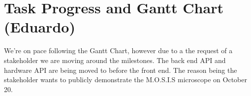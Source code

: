 \section{Task Progress and Gantt Chart (Eduardo)}
We're on pace following the Gantt Chart, however due to a the request of a stakeholder we are moving around the milestones. The back end API and hardware API are being moved to before the front end. The reason being the stakeholder wants to publicly demonstrate the M.O.S.I.S microscope on October 20.

